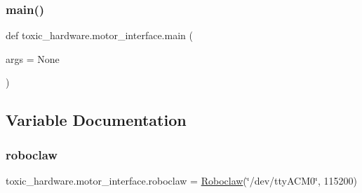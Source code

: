 \subsubsection{\texorpdfstring{main()}{main()}}
{\footnotesize\ttfamily def toxic\+\_\+hardware.\+motor\+\_\+interface.\+main (\begin{DoxyParamCaption}\item[{}]{args = {\ttfamily None} }\end{DoxyParamCaption})}



\subsection{Variable Documentation}
\mbox{\label{namespacetoxic__hardware_1_1motor__interface_a16c7b96fda2822af1075c24bec28e128}} 
\subsubsection{\texorpdfstring{roboclaw}{roboclaw}}
{\footnotesize\ttfamily toxic\+\_\+hardware.\+motor\+\_\+interface.\+roboclaw = \mbox{\hyperlink{classtoxic__hardware_1_1roboclaw__3_1_1Roboclaw}{Roboclaw}}(\char`\"{}/dev/tty\+A\+C\+M0\char`\"{}, 115200)}

